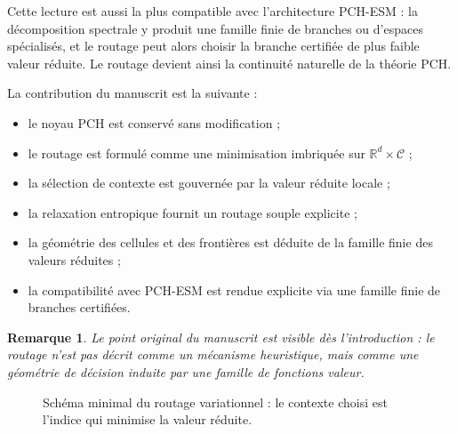 \documentclass[11pt,a4paper]{article}
\newtheorem{remark}{Remarque}[section]
\DeclareMathOperator{\argmin}{argmin}
\newcommand{\R}{\mathbb R}
\newcommand{\Ccal}{\mathcal C}
\begin{document}
Cette lecture est aussi la plus compatible avec l'architecture PCH-ESM : la décomposition spectrale y produit une famille finie de branches ou d'espaces spécialisés, et le routage peut alors choisir la branche certifiée de plus faible valeur réduite. Le routage devient ainsi la continuité naturelle de la théorie PCH.

La contribution du manuscrit est la suivante :
\begin{itemize}[leftmargin=2em]
    \item le noyau PCH est conservé sans modification ;
    \item le routage est formulé comme une minimisation imbriquée sur \(\R^d\times\Ccal\) ;
    \item la sélection de contexte est gouvernée par la valeur réduite locale ;
    \item la relaxation entropique fournit un routage souple explicite ;
    \item la géométrie des cellules et des frontières est déduite de la famille finie des valeurs réduites ;
    \item la compatibilité avec PCH-ESM est rendue explicite via une famille finie de branches certifiées.
\end{itemize}

\begin{remark}
Le point original du manuscrit est visible dès l'introduction : le routage n'est pas décrit comme un mécanisme heuristique, mais comme une géométrie de décision induite par une famille de fonctions valeur.
\end{remark}

\begin{figure}[ht]
\centering
{}
\caption{Schéma minimal du routage variationnel : le contexte choisi est l'indice qui minimise la valeur réduite.}
\end{figure}
\end{document}
